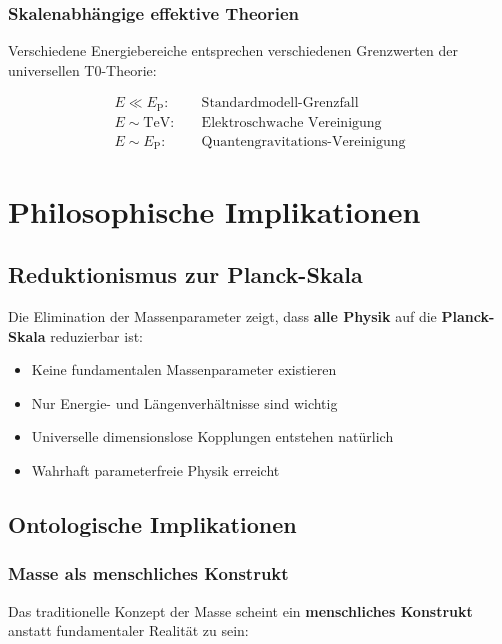 \documentclass[12pt,a4paper]{article}
\newcommand{\EP}{E_{\text{P}}}
\begin{document}
	\subsubsection{Skalenabhängige effektive Theorien}
	
	Verschiedene Energiebereiche entsprechen verschiedenen Grenzwerten der universellen T0-Theorie:
	
	\begin{align}
		E \ll \EP: \quad &\text{Standardmodell-Grenzfall} \\
		E \sim \text{TeV}: \quad &\text{Elektroschwache Vereinigung} \\
		E \sim \EP: \quad &\text{Quantengravitations-Vereinigung}
	\end{align}
	
	\section{Philosophische Implikationen}
	\label{sec:philosophical}
	
	\subsection{Reduktionismus zur Planck-Skala}
	\label{subsec:reductionism}
	
	Die Elimination der Massenparameter zeigt, dass \textbf{alle Physik} auf die \textbf{Planck-Skala} reduzierbar ist:
	
	\begin{itemize}
		\item Keine fundamentalen Massenparameter existieren
		\item Nur Energie- und Längenverhältnisse sind wichtig
		\item Universelle dimensionslose Kopplungen entstehen natürlich
		\item Wahrhaft parameterfreie Physik erreicht
	\end{itemize}
	
	\subsection{Ontologische Implikationen}
	\label{subsec:ontological}
	
	\subsubsection{Masse als menschliches Konstrukt}
	
	Das traditionelle Konzept der Masse scheint ein \textbf{menschliches Konstrukt} anstatt fundamentaler Realität zu sein:
	
\end{document}
